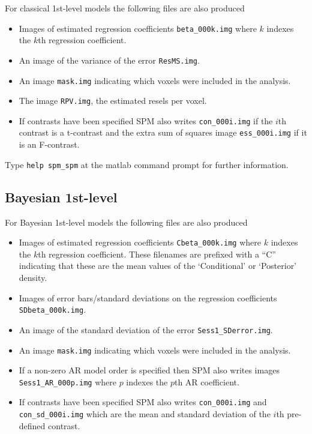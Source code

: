For classical 1st-level models the following files are also produced

\begin{itemize}

\item{Images of estimated regression coefficients  \verb!beta_000k.img! where $k$ indexes the $k$th regression coefficient.}

\item{An image of the variance of the error \verb!ResMS.img!.}

\item{An image \verb!mask.img! indicating which voxels were included in the analysis.}

\item{The image \verb!RPV.img!, the estimated resels per voxel.}

\item{If contrasts have been specified SPM also writes \verb!con_000i.img!  if the $i$th contrast is a t-contrast and the extra sum of squares image \verb!ess_000i.img! if it is an F-contrast.} 

\end{itemize}

Type \verb!help spm_spm! at the matlab command prompt for further information.

\subsection{Bayesian 1st-level}

For Bayesian 1st-level models the following files are also produced

\begin{itemize}

\item{Images of estimated regression coefficients  \verb!Cbeta_000k.img! where $k$ indexes the $k$th regression coefficient. These filenames are prefixed with a ``C'' indicating that these are the mean values of the `Conditional' or `Posterior' density.}

\item{Images of error bars/standard deviations on the regression coefficients \verb!SDbeta_000k.img!.}

\item{An image of the standard deviation of the error \verb!Sess1_SDerror.img!.}

\item{An image \verb!mask.img! indicating which voxels were included in the analysis.}

\item{If a non-zero AR model order is specified then SPM also writes images \verb!Sess1_AR_000p.img! where $p$ indexes the $p$th AR coefficient.}

\item{If contrasts have been specified SPM also writes \verb!con_000i.img! and \verb!con_sd_000i.img! which are the mean and standard deviation of the $i$th pre-defined contrast.}

\end{itemize}

